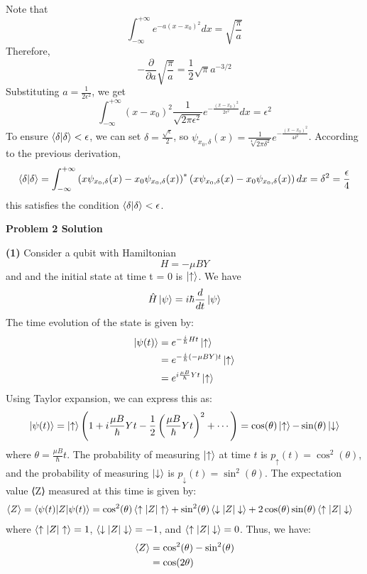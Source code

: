 \documentclass[12pt]{article}
\begin{document}
Note that
\[
\int_{-\infty}^{+\infty} e^{-a(x-x_0)^2} dx = \sqrt{\frac{\pi}{a}}
\]
Therefore,
\[
-\frac{\partial}{\partial a} \sqrt{\frac{\pi}{a}} = \frac{1}{2} \sqrt{\pi} a^{-3/2}
\]
Substituting $a = \frac{1}{2\epsilon^2}$, we get
\[
\int_{-\infty}^{+\infty}(x-x_0)^2\frac{1}{\sqrt{2\pi\epsilon^2}}e^{-\frac{(x-x_0)^2}{2\epsilon^2}}dx = \epsilon^2
\]
To ensure $\braket{\delta | \delta} < \epsilon$, we can set $\delta = \frac{\sqrt{\epsilon}}{2}$, so $\psi_{x_0,\delta}(x) = \frac{1}{\sqrt[4]{2\pi\delta^2}} e^{-\frac{(x-x_0)^2}{4\delta^2}}$. According to the previous derivation,
\[
\braket{\delta | \delta} = \int_{-\infty}^{+\infty} \left( x \psi_{x_0,\delta}(x) - x_0 \psi_{x_0,\delta}(x) \right)^* \left( x \psi_{x_0,\delta}(x) - x_0 \psi_{x_0,\delta}(x) \right) dx = \delta^2 = \frac{\epsilon}{4}
\]
this satisfies the condition $\braket{\delta | \delta} < \epsilon$.

\begin{center}
    \textbf{Problem 2 Solution}
\end{center}
\textbf{(1)} Consider a qubit with Hamiltonian $$H = {-}\mu BY$$ and and the initial state at time t = 0 is $\ket{\uparrow}$.
We have\[ \hat{H}\ket{\psi}=i\hbar \frac{d}{dt}\ket{\psi} \]  
The time evolution of the state is given by:
\begin{align*}
    \ket{\psi(t)} &= e^{-\frac{i}{\hbar} H t} \ket{\uparrow} \\
    &= e^{-\frac{i}{\hbar} (-\mu B Y) t} \ket{\uparrow} \\
    &= e^{i \frac{\mu B}{\hbar} Y t} \ket{\uparrow}
\end{align*}
Using Taylor expansion, we can express this as:
\[\ket{\psi(t)} = \ket{\uparrow} \left( 1 + i \frac{\mu B}{\hbar} Y t - \frac{1}{2} \left( \frac{\mu B}{\hbar} Y t \right)^2 + \cdots \right)=\cos(\theta)\ket{\uparrow}{-}\sin(\theta)\ket{\downarrow}\]
where $\theta = \frac{\mu B}{\hbar} t$. The probability of measuring $\ket{\uparrow}$ at time $t$ is $p_{\uparrow}(t) = \cos^2(\theta)$, and the probability of measuring $\ket{\downarrow}$ is $p_{\downarrow}(t) = \sin^2(\theta)$.
The expectation value ⟨Z⟩ measured at this time is given by:
\begin{align*}
    \braket{Z} &= \braket{\psi(t) | Z | \psi(t)} = \cos^2(\theta) \braket{\uparrow | Z | \uparrow} + \sin^2(\theta) \braket{\downarrow | Z | \downarrow} + 2\cos(\theta)\sin(\theta) \braket{\uparrow | Z | \downarrow}
\end{align*}
where $\braket{\uparrow | Z | \uparrow} = 1$, $\braket{\downarrow | Z | \downarrow} = -1$, and $\braket{\uparrow | Z | \downarrow} = 0$. Thus, we have:
\begin{align*}
    \braket{Z} &= \cos^2(\theta) - \sin^2(\theta) \\
    &= \cos(2\theta)
\end{align*}
\end{document}
